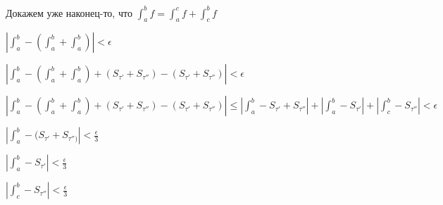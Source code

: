 \documentclass[a4paper]{article}
\begin{document}
\begin{definit}
Докажем уже наконец-то, что $\displaystyle \int_a^b f = \int_a^c f + \int_c^b f $

$\displaystyle \left| \int_a^b - \left( \int_a^b + \int_a^b \right) \right| < \epsilon$

$\displaystyle \left| \int_a^b - \left( \int_a^b + \int_a^b \right) + \left( S_{\tau'} + S_{\tau''} \right) - (S_{\tau'} + S_{\tau''}) \right| < \epsilon$

$\displaystyle \left| \int_a^b - \left( \int_a^b + \int_a^b \right) + \left( S_{\tau'} + S_{\tau''} \right) - (S_{\tau'} + S_{\tau''}) \right| \leq \left| \int_a^b -  S_{\tau'} + S_{\tau''} \right| + \left| \int_a^b - S_{\tau'} \right| + \left| \int_c^b - S_{\tau''} \right| <\epsilon$

$\left| \int_a^b - ( S_{\tau'} + S_{\tau'')} \right| < \frac{\epsilon}{3}$

$ \left| \int_a^b - S_{\tau'} \right| < \frac{\epsilon}{3}$

$\left| \int_c^b - S_{\tau''} \right| < \frac{\epsilon}{3}$

\end{definit}
\end{document}
